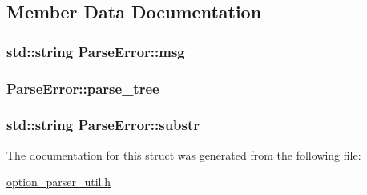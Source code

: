 \subsection{Member Data Documentation}
\hypertarget{structParseError_a227713acbd1e08bfa58164bc5ff8f37c}{
\subsubsection[{msg}]{\setlength{\rightskip}{0pt plus 5cm}std\-::string Parse\-Error\-::msg}}\label{structParseError_a227713acbd1e08bfa58164bc5ff8f37c}
\hypertarget{structParseError_ab28a854e1adab7bda64f95f4fe3abf0e}{
\subsubsection[{parse\-\_\-tree}]{ Parse\-Error\-::parse\-\_\-tree}}\label{structParseError_ab28a854e1adab7bda64f95f4fe3abf0e}
\hypertarget{structParseError_afdf019ca7c83bb77412262baf3c319ee}{
\subsubsection[{substr}]{\setlength{\rightskip}{0pt plus 5cm}std\-::string Parse\-Error\-::substr}}\label{structParseError_afdf019ca7c83bb77412262baf3c319ee}


The documentation for this struct was generated from the following file\-:\begin{DoxyCompactItemize}
\item 
\hyperlink{option__parser__util_8h}{option\-\_\-parser\-\_\-util.\-h}\end{DoxyCompactItemize}
